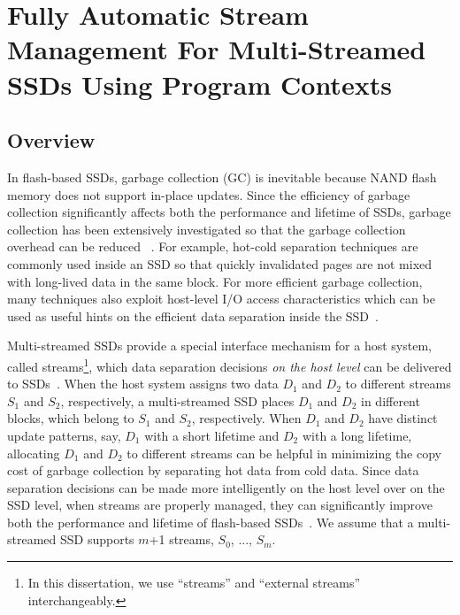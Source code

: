 \chapter{Fully Automatic Stream Management For Multi-Streamed SSDs Using Program Contexts} 
\label{chap:PCstream}

\section{Overview}

In flash-based SSDs, garbage collection (GC) is inevitable because NAND flash
memory does not support in-place updates.  Since the efficiency of garbage
collection significantly affects  both the performance and lifetime of SSDs,
garbage collection has been extensively investigated so that the garbage
collection overhead can be reduced ~\cite{DAC, WriteAmplification, GCGreedy,
GCVictim, GCTTFlash, HotCold}.  For example, hot-cold separation techniques are
commonly used inside an SSD so that quickly invalidated pages are not mixed
with long-lived data in the same block.   For more efficient garbage
collection, many techniques also exploit host-level I/O access characteristics
which can be used as useful hints on the efficient data separation inside the
SSD~\cite{JiTGC, ShadowGC}.

Multi-streamed SSDs provide a special interface mechanism for a host system,
called streams\footnote{In this dissertation, we use ``streams'' and ``external
streams'' interchangeably.}, which data separation decisions {\it on the
host level} can be delivered to SSDs~\cite{T10, MultiStream}.  When the host
system assigns two data $D_1$ and $D_2$ to different streams $S_1$ and $S_2$,
respectively, a multi-streamed SSD places $D_1$ and $D_2$ in different blocks,
which belong to $S_1$ and $S_2$, respectively.  When $D_1$ and $D_2$ have
distinct update patterns, say, $D_1$ with a short lifetime and $D_2$ with a
long lifetime, allocating $D_1$ and $D_2$ to different streams can be helpful
in minimizing the copy cost of garbage collection by separating hot data from
cold data.  Since data separation decisions can be made more intelligently on
the host level over on the SSD level, when streams are properly managed, they
can significantly improve both the performance and lifetime of flash-based
SSDs~\cite{MultiStream, Level,vStream, FStream, AutoStream}.  We assume that a
multi-streamed SSD supports $m$+1 streams, $S_0$, ..., $S_{m}$.

